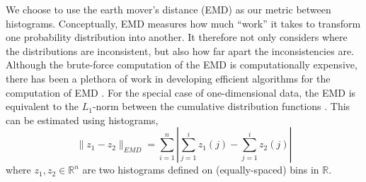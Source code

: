 \documentclass[prl, reprint, final, showkeys]{revtex4-1}
\begin{document}
We choose to use the earth mover's distance (EMD) \cite{rubner2000earth} as our metric between histograms.
%
Conceptually, EMD measures how much ``work'' it takes to transform one probability distribution into another.
%
It therefore not only considers where the distributions are inconsistent, but also how far apart the inconsistencies are.
%
Although the brute-force computation of the EMD is computationally expensive, there has been a plethora of work in developing efficient algorithms for the computation of EMD \cite{Pele-eccv2008, Pele-iccv2009}.
%
%
%
For the special case of one-dimensional data, the EMD is equivalent to the $L_1$-norm between the cumulative distribution functions \cite{rubner2000perceptual}.
%
This can be estimated using histograms, 
\begin{equation}
\| z_1 - z_2 \|_{EMD} = \sum_{i=1}^{n} \left| \sum_{j=1}^i z_1(j) - \sum_{j=1}^i z_2(j) \right|
\end{equation}
where $z_1, z_2 \in \mathbb{R}^n$ are two histograms defined on (equally-spaced) bins in $\mathbb{R}$. 

\end{document}
